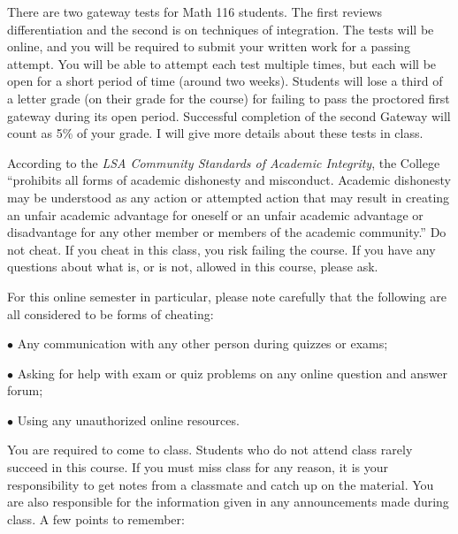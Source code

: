 \documentclass[11pt,twoside]{article}
\newcommand\topic[1]{\noindent{\bf #1}}
\begin{document}
\vspace{7pt}
\topic{Gateway Exams:}  There are two gateway tests for Math 116 students. The first reviews differentiation and the second is on techniques of integration. The tests will be online, and you will be required to submit your written work for a passing attempt. You will be able to attempt each test multiple times, but each will be open for a short period of time (around two weeks). Students will lose a third of a letter grade (on their grade for the course) for failing to pass the proctored first gateway during its open period. Successful completion of the second Gateway will count as 5\% of your grade. I will give more details about these tests in class.


\vspace{7pt}

\topic{Academic Integrity:} According to the \emph{LSA Community Standards of Academic Integrity}, the College ``prohibits all forms of academic dishonesty and misconduct.  Academic dishonesty may be understood as any action or attempted action that may result in creating an unfair academic advantage for oneself or an unfair academic advantage or disadvantage for any other member or members of the academic community.''  Do {\sc not} cheat.  If you cheat in this class, you risk failing the course. If you have any questions about what is, or is not, allowed in this course, please ask.

For this online semester in particular, please note carefully that the following are all considered to be forms of cheating:

\hspace{-1ex}$\bullet$ Any communication with any other person during quizzes or exams;

\hspace{-1ex}$\bullet$ Asking for help with exam or quiz problems on any online question and answer forum;

\hspace{-1ex}$\bullet$ Using any unauthorized online resources.


\vspace{7pt}

\topic{In Class:}  You are required to come to class.  Students who do not attend class rarely succeed in this course.  If you must miss class for any reason, it is your responsibility to get notes from a classmate and catch up on the material.  You are also responsible for the information given in any announcements made during class.  
A few points to remember:
\end{document}
